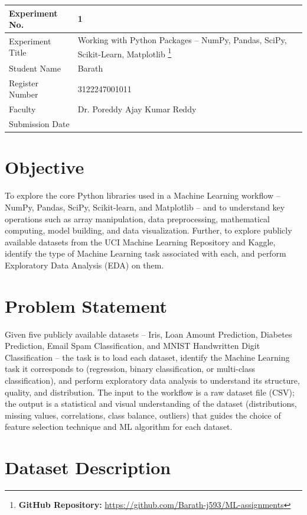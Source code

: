 \documentclass[12pt,a4paper]{article}
\begin{document}
\begin{tabular}{|p{4cm}|p{11cm}|}
\hline
Experiment No. & 1 \\ \hline
Experiment Title & Working with Python Packages -- NumPy, Pandas, SciPy, Scikit-Learn, Matplotlib
\footnote{\textbf{GitHub Repository: }\url{https://github.com/Barath-j593/ML-assignments}}\\ \hline
Student Name & Barath \\ \hline
Register Number & 3122247001011 \\ \hline
Faculty & Dr. Poreddy Ajay Kumar Reddy \\ \hline
Submission Date & \\ \hline
\end{tabular}

\section{Objective}
To explore the core Python libraries used in a Machine Learning workflow -- NumPy, Pandas,
SciPy, Scikit-learn, and Matplotlib -- and to understand key operations such as array
manipulation, data preprocessing, mathematical computing, model building, and data
visualization. Further, to explore publicly available datasets from the UCI Machine Learning
Repository and Kaggle, identify the type of Machine Learning task associated with each, and
perform Exploratory Data Analysis (EDA) on them.

\section{Problem Statement}
Given five publicly available datasets -- Iris, Loan Amount Prediction, Diabetes Prediction,
Email Spam Classification, and MNIST Handwritten Digit Classification -- the task is to load
each dataset, identify the Machine Learning task it corresponds to (regression, binary
classification, or multi-class classification), and perform exploratory data analysis to
understand its structure, quality, and distribution. The input to the workflow is a raw
dataset file (CSV); the output is a statistical and visual understanding of the dataset
(distributions, missing values, correlations, class balance, outliers) that guides the choice
of feature selection technique and ML algorithm for each dataset.

\section{Dataset Description}
\end{document}
